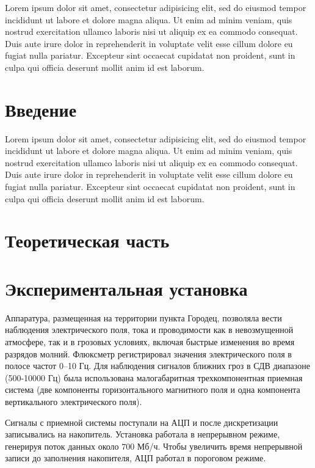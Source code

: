 \documentclass[a4paper,14pt]{extarticle}
\begin{document}
Lorem ipsum dolor sit amet, consectetur adipisicing elit, sed do eiusmod
tempor incididunt ut labore et dolore magna aliqua. Ut enim ad minim veniam,
quis nostrud exercitation ullamco laboris nisi ut aliquip ex ea commodo
consequat. Duis aute irure dolor in reprehenderit in voluptate velit esse
cillum dolore eu fugiat nulla pariatur. Excepteur sint occaecat cupidatat non
proident, sunt in culpa qui officia deserunt mollit anim id est laborum.


\section*{Введение}

Lorem ipsum dolor sit amet, consectetur adipisicing elit, sed do eiusmod
tempor incididunt ut labore et dolore magna aliqua. Ut enim ad minim veniam,
quis nostrud exercitation ullamco laboris nisi ut aliquip ex ea commodo
consequat. Duis aute irure dolor in reprehenderit in voluptate velit esse
cillum dolore eu fugiat nulla pariatur. Excepteur sint occaecat cupidatat non
proident, sunt in culpa qui officia deserunt mollit anim id est laborum.

\section{Теоретическая часть}

\section{Экспериментальная установка}

Аппаратура, размещенная на территории пункта Городец, позволяла вести наблюдения электрического поля, тока и проводимости как в невозмущенной атмосфере, так и в грозовых условиях, включая быстрые изменения во время разрядов молний. Флюксметр регистрировал значения электрического поля в полосе частот 0--10 Гц. Для наблюдения сигналов ближних гроз в СДВ диапазоне (500-10000 Гц) была использована малогабаритная трехкомпонентная приемная система (две компоненты горизонтального магнитного поля и одна компонента вертикального электрического поля). 



Сигналы с приемной системы поступали на АЦП и после дискретизации записывались на накопитель. Установка работала в непрерывном режиме, генерируя поток данных около $700$ Мб/ч. Чтобы увеличить время непрерывной записи до заполнения накопителя, АЦП работал в пороговом режиме. 
\end{document}
